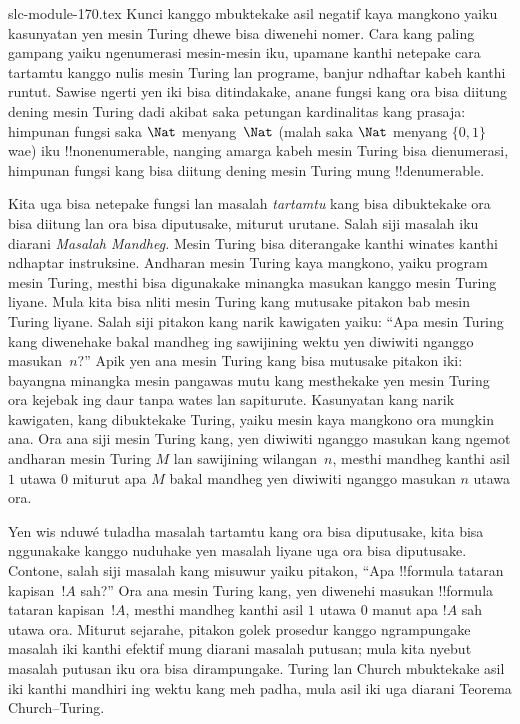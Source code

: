 \begin{filecontents*}[overwrite]{slc-module-170.tex}
Kunci kanggo mbuktekake asil negatif kaya mangkono
yaiku kasunyatan yen mesin Turing dhewe bisa diwenehi
nomer. Cara kang paling gampang yaiku ngenumerasi
mesin-mesin iku, upamane kanthi netepake cara tartamtu
kanggo nulis mesin Turing lan programe, banjur
ndhaftar kabeh kanthi runtut. Sawise ngerti yen
iki bisa ditindakake, anane fungsi kang ora bisa
diitung dening mesin Turing dadi akibat saka
petungan kardinalitas kang prasaja: himpunan fungsi
saka $\Nat$ menyang~$\Nat$ (malah saka $\Nat$ menyang
$\{0, 1\}$ wae) iku !!{nonenumerable}, nanging
amarga kabeh mesin Turing bisa dienumerasi, himpunan
fungsi kang bisa diitung dening mesin Turing mung
!!{denumerable}.

Kita uga bisa netepake fungsi lan masalah
\emph{tartamtu} kang bisa dibuktekake ora bisa
diitung lan ora bisa diputusake, miturut urutane.
Salah siji masalah iku diarani \emph{Masalah Mandheg.}
Mesin Turing bisa diterangake kanthi winates
kanthi ndhaptar instruksine. Andharan mesin
Turing kaya mangkono, yaiku program mesin Turing,
mesthi bisa digunakake minangka masukan kanggo
mesin Turing liyane. Mula kita bisa nliti mesin
Turing kang mutusake pitakon bab mesin Turing liyane.
Salah siji pitakon kang narik kawigaten yaiku:
``Apa mesin Turing kang diwenehake bakal mandheg
ing sawijining wektu yen diwiwiti nganggo masukan~$n$?''
Apik yen ana mesin Turing kang bisa mutusake pitakon
iki: bayangna minangka mesin pangawas mutu kang
mesthekake yen mesin Turing ora kejebak ing daur
tanpa wates lan sapiturute. Kasunyatan kang narik
kawigaten, kang dibuktekake Turing, yaiku mesin kaya
mangkono ora mungkin ana. Ora ana siji mesin Turing
kang, yen diwiwiti nganggo masukan kang ngemot andharan
mesin Turing $M$ lan sawijining wilangan~$n$, mesthi
mandheg kanthi asil $1$ utawa $0$ miturut apa
$M$ bakal mandheg yen diwiwiti nganggo masukan $n$
utawa ora.

Yen wis nduwé tuladha masalah tartamtu kang ora bisa
diputusake, kita bisa nggunakake kanggo nuduhake
yen masalah liyane uga ora bisa diputusake. Contone,
salah siji masalah kang misuwur yaiku pitakon,
``Apa !!{formula} tataran kapisan~$!A$ sah?''
Ora ana mesin Turing kang, yen diwenehi masukan
!!{formula} tataran kapisan~$!A$, mesthi mandheg
kanthi asil $1$ utawa $0$ manut apa $!A$
sah utawa ora. Miturut sejarahe, pitakon golek
prosedur kanggo ngrampungake masalah iki kanthi
efektif mung diarani masalah putusan;
mula kita nyebut masalah putusan iku ora bisa
dirampungake. Turing lan Church mbuktekake asil
iki kanthi mandhiri ing wektu kang meh padha,
mula asil iki uga diarani Teorema Church--Turing.


\end{filecontents*}

